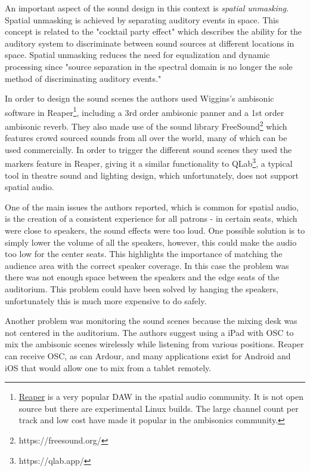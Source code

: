 An important aspect of the sound design in this context is \textit{spatial unmasking}. Spatial unmasking is achieved by separating auditory events in space. This concept is related to the "cocktail party effect" which describes the ability for the auditory system to discriminate between sound sources at different locations in space. Spatial unmasking reduces the need for equalization and dynamic processing since "source separation in the spectral domain is no longer the sole method of discriminating auditory events.\cite{vilkaitis2019ambisonic}" 

In order to design the sound scenes the authors used Wiggins's ambisonic software in Reaper\footnote{\href{https://www.reaper.fm/}{Reaper} is a very popular DAW in the spatial audio community. It is not open source but there are experimental Linux builds. The large channel count per track and low cost have made it popular in the ambisonics community.}, including a 3rd order ambisonic panner and a 1st order ambisonic reverb\cite{wiggins2016ambifreeverb}. They also made use of the sound library FreeSound\footnote{https://freesound.org/} which features crowd sourced sounds from all over the world, many of which can be used commercially. In order to trigger the different sound scenes they used the markers feature in Reaper, giving it a similar functionality to QLab\footnote{https://qlab.app/}, a typical tool in theatre sound and lighting design, which unfortunately, does not support spatial audio. 

One of the main issues the authors reported, which is common for spatial audio, is the creation of a consistent experience for all patrons - in certain seats, which were close to speakers, the sound effects were too loud. One possible solution is to simply lower the volume of all the speakers, however, this could make the audio too low for the center seats. This highlights the importance of matching the audience area with the correct speaker coverage. In this case the problem was there was not enough space between the speakers and the edge seats of the auditorium. This problem could have been solved by hanging the speakers, unfortunately this is much more expensive to do safely.

Another problem was monitoring the sound scenes because the mixing desk was not centered in the auditorium. The authors suggest using a iPad with OSC to mix the ambisonic scenes wirelessly while listening from various positions. Reaper can receive OSC, as can Ardour, and many applications exist for Android and iOS that would allow one to mix from a tablet remotely. 

